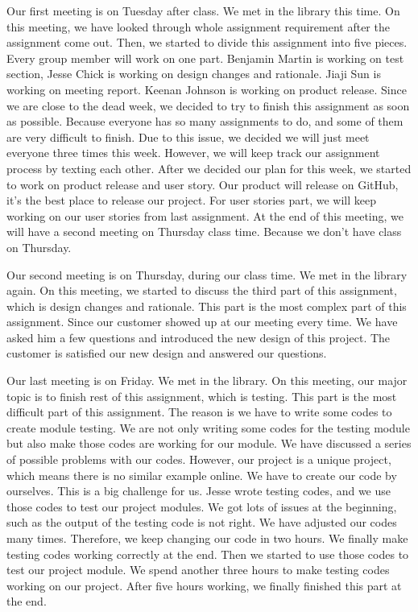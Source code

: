 \documentclass[12pt]{article}
\begin{document}
\par Our first meeting is on Tuesday after class. We met in the library this time. On this meeting, we have looked through whole assignment requirement after the assignment come out. Then, we started to divide this assignment into five pieces. Every group member will work on one part. Benjamin Martin is working on test section, Jesse Chick is working on design changes and rationale. Jiaji Sun is working on meeting report. Keenan Johnson is working on product release. Since we are close to the dead week, we decided to try to finish this assignment as soon as possible. Because everyone has so many assignments to do, and some of them are very difficult to finish. Due to this issue, we decided we will just meet everyone three times this week. However, we will keep track our assignment process by texting each other. After we decided our plan for this week, we started to work on product release and user story. Our product will release on GitHub, it’s the best place to release our project. For user stories part, we will keep working on our user stories from last assignment. At the end of this meeting, we will have a second meeting on Thursday class time. Because we don’t have class on Thursday. \\

\par Our second meeting is on Thursday, during our class time. We met in the library again. On this meeting, we started to discuss the third part of this assignment, which is design changes and rationale. This part is the most complex part of this assignment. Since our customer showed up at our meeting every time. We have asked him a few questions and introduced the new design of this project. The customer is satisfied our new design and answered our questions. \\

\par Our last meeting is on Friday. We met in the library. On this meeting, our major topic is to finish rest of this assignment, which is testing. This part is the most difficult part of this assignment. The reason is we have to write some codes to create module testing. We are not only writing some codes for the testing module but also make those codes are working for our module. We have discussed a series of possible problems with our codes. However, our project is a unique project, which means there is no similar example online. We have to create our code by ourselves. This is a big challenge for us. Jesse wrote testing codes, and we use those codes to test our project modules. We got lots of issues at the beginning, such as the output of the testing code is not right. We have adjusted our codes many times. Therefore, we keep changing our code in two hours. We finally make testing codes working correctly at the end. Then we started to use those codes to test our project module. We spend another three hours to make testing codes working on our project. After five hours working, we finally finished this part at the end. \\
\end{document}
